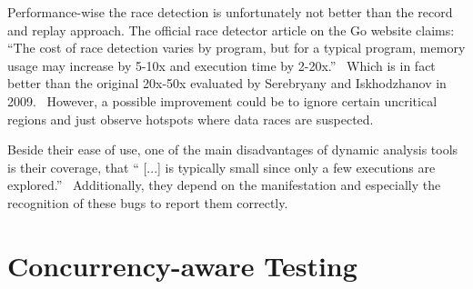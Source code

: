 \documentclass[conference]{IEEEtran}
\begin{document}
Performance-wise the race detection is unfortunately not better than the record and replay approach.
The official race detector article on the Go website claims: ``The cost of race detection varies by program, but for a typical program, memory usage may increase by 5-10x and execution time by 2-20x.''~\cite{goRaceDetector}
Which is in fact better than the original 20x-50x evaluated by Serebryany and Iskhodzhanov in 2009.~\cite{serebry2009threadsanitizer}
However, a possible improvement could be to ignore certain uncritical regions and just observe hotspots where data races are suspected.


Beside their ease of use, one of the main disadvantages of dynamic analysis tools is their coverage, that `` [...] is typically small since only a few executions are explored.''~\cite{qadeer2004kiss}
Additionally, they depend on the manifestation and especially the recognition of these bugs to report them correctly.


\section{Concurrency-aware Testing}
\label{sct:testing}
\end{document}
